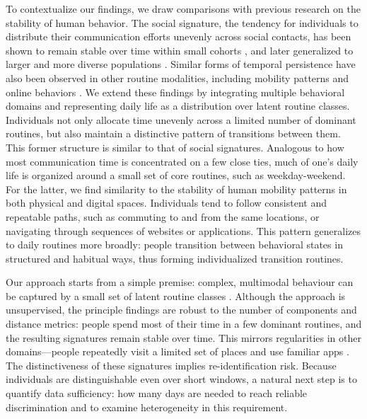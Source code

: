 \documentclass[pdflatex,sn-vancouver,Numbered]{bst/sn-jnl}%
\theoremstyle{thmstyleone}%
\theoremstyle{thmstyletwo}%
\theoremstyle{thmstylethree}%
\begin{document}
To contextualize our findings, we draw comparisons with previous research on the stability of human behavior. The social signature, the tendency for individuals to distribute their communication efforts unevenly across social contacts, has been shown to remain stable over time within small cohorts \cite{saramaki2014persistence}, and later generalized to larger and more diverse populations \cite{heydari2018multichannel, iniguezUniversalPatternsEgocentric2023}. Similar forms of temporal persistence have also been observed in other routine modalities, including mobility patterns \cite{alessandrettiUnderstandingInterplaySocial2018, alessandretti2020scales} and online behaviors \cite{kulshrestha2021web, malmi2016you}. We extend these findings by integrating multiple behavioral domains and representing daily life as a distribution over latent routine classes. Individuals not only allocate time unevenly across a limited number of dominant routines, but also maintain a distinctive pattern of transitions between them. This former structure is similar to that of social signatures. Analogous to how most communication time is concentrated on a few close ties, much of one’s daily life is organized around a small set of core routines, such as weekday-weekend. For the latter, we find similarity to the stability of human mobility patterns in both physical and digital spaces. Individuals tend to follow consistent and repeatable paths, such as commuting to and from the same locations, or navigating through sequences of websites or applications. This pattern generalizes to daily routines more broadly: people transition between behavioral states in structured and habitual ways, thus forming individualized transition routines.

Our approach starts from a simple premise: complex, multimodal behaviour can be captured by a small set of latent routine classes \cite{eagleEigenbehaviorsIdentifyingStructure2009a,aledavood2022quantifying,zhou2022predicting}. Although the approach is unsupervised, the principle findings are robust to the number of components and distance metrics: people spend most of their time in a few dominant routines, and the resulting signatures remain stable over time. This mirrors regularities in other domains—people repeatedly visit a limited set of places \cite{alessandretti2020scales} and use familiar apps \cite{sekaraTemporalCulturalLimits2021}. The distinctiveness of these signatures implies re-identification risk. Because individuals are distinguishable even over short windows, a natural next step is to quantify data sufficiency: how many days are needed to reach reliable discrimination and to examine heterogeneity in this requirement.
\end{document}
